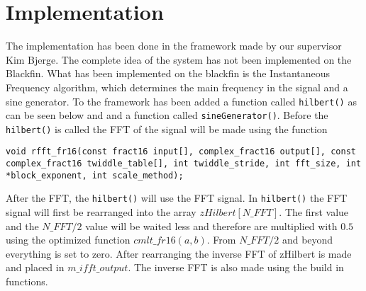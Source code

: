 
\section{Implementation}
\label{sec:impl}
The implementation has been done in the framework made by our supervisor Kim Bjerge.
The complete idea of the system has not been implemented on the Blackfin.
What has been implemented on the blackfin is the Instantaneous Frequency algorithm, which determines the main frequency in the signal and a sine generator.
To the framework has been added a function called \texttt{hilbert()} as can be seen below and and a function called \texttt{sineGenerator()}.
Before the \texttt{hilbert()} is called the FFT of the signal will be made using the function 

\begin{verbatim}
void rfft_fr16(const fract16 input[], complex_fract16 output[], const complex_fract16 twiddle_table[], int twiddle_stride, int fft_size, int *block_exponent, int scale_method);
\end{verbatim}

After the FFT, the \texttt{hilbert()} will use the FFT signal. In \texttt{hilbert()} the FFT signal will first be rearranged into the array $zHilbert[N\_FFT]$.
The first value and the $N\_FFT/2$ value will be waited less and therefore are multiplied with $0.5$ using the optimized function $cmlt\_fr16(a,b)$.
From $N\_FFT/2$ and beyond everything is set to zero. 
After rearranging the inverse FFT of zHilbert is made and placed in $m\_ifft\_output$.
The inverse FFT is also made using the build in functions.

